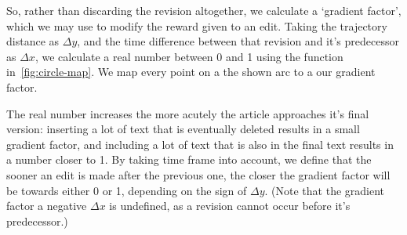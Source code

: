 So, rather than discarding the revision altogether, we calculate a
`gradient factor', which we may use to modify the reward given to an
edit. Taking the trajectory distance as $\Delta y$, and the time
difference between that revision and it's predecessor as $\Delta x$,
we calculate a real number between 0 and 1 using the function
in~\ref{fig:circle-map}. We map every point on a the shown arc to a
our gradient factor. 

The real number increases the more acutely the article approaches it's
final version: inserting a lot of text that is eventually deleted
results in a small gradient factor, and including a lot of text that
is also in the final text results in a number closer to 1. By taking
time frame into account, we define that the sooner an edit is made
after the previous one, the closer the gradient factor will be towards
either 0 or 1, depending on the sign of $\Delta y$. (Note that the
gradient factor a negative $\Delta x$ is undefined, as a revision
cannot occur before it's predecessor.)





